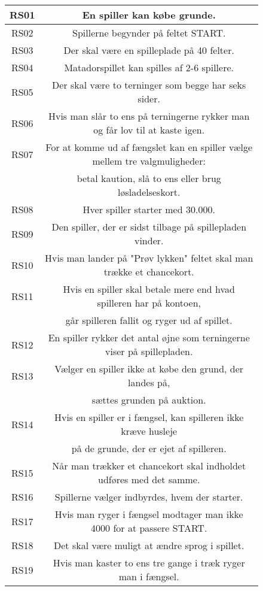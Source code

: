 \begin{figure}[H]
    \centering
\begin{tabular}{ | c | c | } 
\hline
RS01 & En spiller kan købe grunde. \\ 
\hline
RS02 & Spillerne begynder på feltet START. \\ 
\hline
RS03 &  Der skal være en spilleplade på 40 felter.\\ 
\hline
RS04 &  Matadorspillet kan spilles af 2-6 spillere.\\ 
\hline
RS05 & Der skal være to terninger som begge har seks sider. \\
\hline
RS06 &  Hvis man slår to ens på terningerne rykker man og får lov til at kaste igen.\\ 
\hline
RS07 & For at komme ud af fængslet kan en spiller vælge mellem tre valgmuligheder:\\
& betal kaution, slå to ens eller brug løsladelseskort. \\ 
\hline
RS08 &Hver spiller starter med 30.000. \\ 
\hline
RS09 & Den spiller, der er sidst tilbage på spillepladen vinder. \\ 
\hline
RS10 & Hvis man lander på "Prøv lykken" feltet skal man trække et chancekort.\\
\hline
RS11 & Hvis en spiller skal betale mere end hvad spilleren har på kontoen,\\ & går spilleren fallit og ryger ud af spillet.\\
\hline
RS12 & En spiller rykker det antal øjne som terningerne viser på spillepladen. \\ 
\hline
RS13 & Vælger en spiller ikke at købe den grund, der landes på, \\
& sættes grunden på auktion.\\ 
\hline
RS14 & Hvis en spiller er i fængsel, kan spilleren ikke kræve husleje\\
& på de grunde, der er ejet af spilleren. \\
\hline
RS15 & Når man trækker et chancekort skal indholdet udføres med det samme. \\ 
\hline
RS16 &  Spillerne vælger indbyrdes, hvem der starter. \\%
\hline
RS17 &  Hvis man ryger i fængsel modtager man ikke 4000 for at passere START.\\ 
\hline
RS18 & Det skal være muligt at ændre sprog i spillet.  \\ 
\hline
RS19 & Hvis man kaster to ens tre gange i træk ryger man i fængsel. \\

\end{tabular}
\end{figure}
